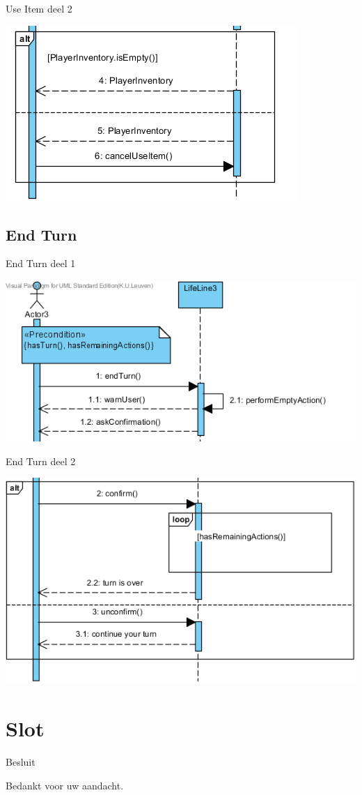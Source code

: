 \documentclass[t]{beamer}
\begin{document}
\begin{frame}{Use Item deel 2}
\begin{center}
\includegraphics[scale=0.9]{images/SSDUseItem2}
\end{center}
\end{frame}

\subsection{End Turn}
\begin{frame}{End Turn deel 1}
\begin{center}
\includegraphics[scale=0.8]{images/SSDEndTurn1}
\end{center}
\end{frame}

\begin{frame}{End Turn deel 2}
\begin{center}
\includegraphics[scale=0.7]{images/SSDEndTurn2}
\end{center}
\end{frame}


\section{Slot}
\begin{frame}{Besluit}
\vspace{0.8in}
\begin{center}
Bedankt voor uw aandacht.
\end{center}
\end{frame}
\end{document}
